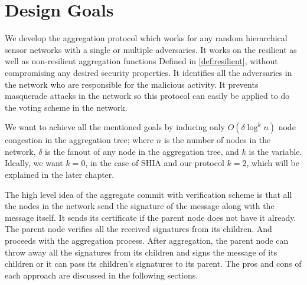 \section{Design Goals}	
	We develop the aggregation protocol which works for any random hierarchical sensor networks with a single or multiple adversaries.
	It works on the resilient as well as non-resilient aggregation functions Defined in \ref{def:resilient}, without compromising any desired security properties.
	It identifies all the adversaries in the network who are responsible for the malicious activity.
	It prevents masquerade attacks in the network so this protocol can easily be applied to do the voting scheme in the network.

	We want to achieve all the mentioned goals by inducing only $O(\delta \log^{k} n)$ node congestion in the aggregation tree; where $n$ is the number of nodes in the network, $\delta$ is the fanout of any node in the aggregation tree, and $k$ is the variable.
	Ideally, we want $k=0$, in the case of SHIA and our protocol $k=2$, which will be explained in the later chapter.

	The high level idea of the aggregate commit with verification scheme is that all the nodes in the network send the signature of the message along with the message itself. 
	It sends its certificate if the parent node does not have it already.
	The parent node verifies all the received signatures from its children.
	And proceeds with the aggregation process.
	After aggregation, the parent node can throw away all the signatures from its children and signs the message of its children or it can pass its children's signatures to its parent. 
	The pros and cons of each approach are discussed in the following sections. 

